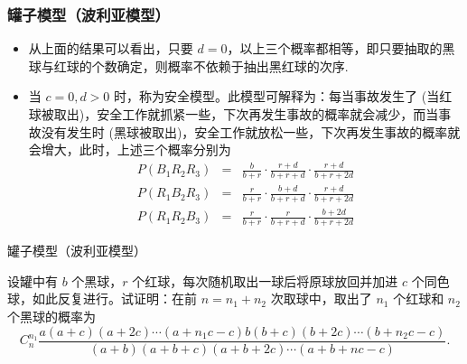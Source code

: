 \begin{frame}
	\frametitle{罐子模型（波利亚模型）}
	\begin{itemize}[<+-|alert@+>]
		\item 从上面的结果可以看出，只要 $d=0$，以上三个概率都相等，即只要抽取的黑球与红球的个数确定，则概率不依赖于抽出黑红球的次序.
		\item 当 $c=0,d>0$ 时，称为安全模型。此模型可解释为：每当事故发生了 (当红球被取出)，安全工作就抓紧一些，下次再发生事故的概率就会减少，而当事故没有发生时 (黑球被取出)，安全工作就放松一些，下次再发生事故的概率就会增大，此时，上述三个概率分别为
		{\small\begin{eqnarray*}
				P(B_1R_2R_3) &=&\frac{b}{b+r}\cdot\frac{r+d}{b+r+d}\cdot\frac{r+d}{b+r+2d}\\
				P(R_1B_2R_3)&=&\frac{r}{b+r}\cdot\frac{b+d}{b+r+d}\cdot\frac{r+d}{b+r+2d}\\
				P(R_1R_2B_3) &=&\frac{r}{b+r}\cdot\frac{r}{b+r+d}\cdot\frac{b+2d}{b+r+2d}
		\end{eqnarray*}}
	\end{itemize}

\end{frame}

\begin{frame}{罐子模型（波利亚模型）}
	\begin{exam}
	设罐中有 $b$ 个黑球，$r$ 个红球，每次随机取出一球后将原球放回并加进 $c$ 个同色球，如此反复进行。试证明：在前 $n=n_1+n_2$ 次取球中，取出了 $n_1$ 个红球和 $n_2$ 个黑球的概率为
		$$C_n^{n_1}\frac{a(a+c)(a+2c)\cdots(a+n_1c-c)b(b+c)(b+2c)\cdots(b+n_2c-c)}{(a+b)(a+b+c)(a+b+2c)\cdots(a+b+nc-c)}.$$
	\end{exam}
\end{frame}


